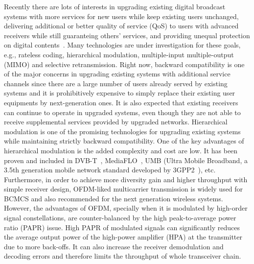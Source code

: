 \documentclass[10pt,fleqn, twocolumn]{IEEEtran}
\begin{document}
Recently there are lots of interests in upgrading existing digital
broadcast systems with more services for new users while keep
existing users unchanged, delivering  additional or better quality
of service (QoS) to users with advanced receivers while still
guaranteing others' services, and providing unequal protection on
digital contents~\cite{DVB,MediaFLO,Jiang05,UMB}. Many
technologies are under investigation for these goals, e.g.,
rateless coding, hierarchical modulation, multiple-input
multiple-output (MIMO) and selective retransmission. Right now,
backward compatibility is one of the major concerns in upgrading
existing systems with additional service channels since there are
a large number of users already served by existing systems and it
is prohibitively expensive to simply replace their existing user
equipments by next-generation ones. It is also expected that
existing receivers can continue to operate in upgraded systems,
even though they are not able to receive supplemental services
provided by upgraded networks. Hierarchical modulation is one of
the promising technologies for upgrading existing systems while
maintaining strictly backward compatibility. One of the key
advantages of hierarchical modulation is the added complexity and
cost are low. It has been proven and included in DVB-T~\cite{DVB},
MediaFLO~\cite{MediaFLO}, UMB (Ultra Mobile Broadband, a 3.5th
generation mobile network standard developed by 3GPP2~\cite{UMB}),
etc. Furthermore, in order to achieve more diversity gain and
higher throughput with simple receiver design, OFDM-liked
multicarrier transmission is widely used for BCMCS and also
recommended for the next generation wireless systems. However, the
advantages of OFDM, specially when it is modulated by high-order
signal constellations, are counter-balanced by the high
peak-to-average power ratio (PAPR) issue. High PAPR of modulated
signals can significantly reduces  the average output power of the
high-power amplifier (HPA) at the transmitter due to more
back-offs. It can also increase the receiver demodulation and
decoding errors and therefore limits the throughput of whole
transceiver chain.
\end{document}
